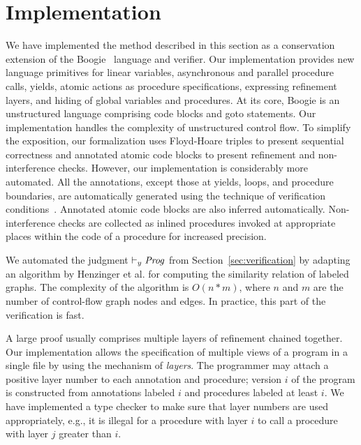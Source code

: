 \section{Implementation}
\label{sec:implementation}

We have implemented the method described in this section as a conservation extension 
of the Boogie~\cite{BarnettCDJL05} language and verifier.
Our implementation provides new language primitives for linear variables, asynchronous and parallel procedure calls, 
yields, atomic actions as procedure specifications, expressing refinement layers, and hiding of global variables and procedures.
At its core, Boogie is an unstructured language comprising code blocks and goto statements.
Our implementation handles the complexity of unstructured control flow.
To simplify the exposition, our formalization uses Floyd-Hoare triples to present sequential correctness and 
annotated atomic code blocks to present refinement and non-interference checks.
However, our implementation is considerably more automated.  
All the annotations, except those at yields, loops, and procedure boundaries, are automatically generated 
using the technique of verification conditions~\cite{BL05}.
Annotated atomic code blocks are also inferred automatically.
Non-interference checks are collected as inlined procedures
invoked at appropriate places within the code of a procedure for increased precision.

We automated the judgment $\vdash_y \mathit{Prog}$ from Section~\ref{sec:verification} 
by adapting an algorithm by Henzinger et al.\cite{HenzingerHK95} for computing the similarity relation of 
labeled graphs.
The complexity of the algorithm is $O(n*m)$, where $n$ and $m$ are the number of control-flow graph nodes and edges.
In practice, this part of the verification is fast.

A large proof usually comprises multiple layers of refinement chained together.
Our implementation allows the specification of multiple views of a program in a single file by using the mechanism of {\em layers}.
The programmer may attach a positive layer number to each annotation and procedure; 
version $i$ of the program is constructed from annotations labeled $i$ and procedures labeled at least $i$.
We have implemented a type checker to make sure that layer numbers are used appropriately, e.g., 
it is illegal for a procedure with layer $i$ to call a procedure with layer $j$ greater than $i$.

